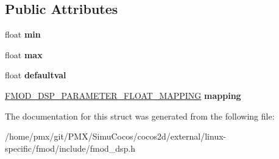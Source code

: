 \subsection*{Public Attributes}
\begin{DoxyCompactItemize}
\item 
\mbox{\label{structFMOD__DSP__PARAMETER__DESC__FLOAT_a579e39ce665f14c1a2be652a51b4f63e}} 
float {\bfseries min}
\item 
\mbox{\label{structFMOD__DSP__PARAMETER__DESC__FLOAT_a899ee155a9eb4db3d14a7a5931ff0c8d}} 
float {\bfseries max}
\item 
\mbox{\label{structFMOD__DSP__PARAMETER__DESC__FLOAT_abfdebbfc2b4e3105346ee977161c4268}} 
float {\bfseries defaultval}
\item 
\mbox{\label{structFMOD__DSP__PARAMETER__DESC__FLOAT_a93c38c393c6b749367763cf104c7482b}} 
\hyperlink{structFMOD__DSP__PARAMETER__FLOAT__MAPPING}{F\+M\+O\+D\+\_\+\+D\+S\+P\+\_\+\+P\+A\+R\+A\+M\+E\+T\+E\+R\+\_\+\+F\+L\+O\+A\+T\+\_\+\+M\+A\+P\+P\+I\+NG} {\bfseries mapping}
\end{DoxyCompactItemize}


The documentation for this struct was generated from the following file\+:\begin{DoxyCompactItemize}
\item 
/home/pmx/git/\+P\+M\+X/\+Simu\+Cocos/cocos2d/external/linux-\/specific/fmod/include/fmod\+\_\+dsp.\+h\end{DoxyCompactItemize}
